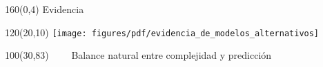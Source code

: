 \documentclass[shownotes,aspectratio=169]{beamer}
\begin{document}
% 
% 
% 
% 
% 
% 
% 
% 
% 
% 
% 
% 
% 



\begin{frame}[plain]
\begin{textblock}{160}(0,4)
\centering \Large  Evidencia
\end{textblock}


 \begin{textblock}{120}(20,10)
  \centering
  \texttt{[image: figures/pdf/evidencia\_de\_modelos\_alternativos]} 
 \end{textblock} 
 
 
 \begin{textblock}{100}(30,83)
  \centering
 \ \ \ \  Balance natural entre complejidad y predicci\'on
  \end{textblock}
\end{frame}
\end{document}
